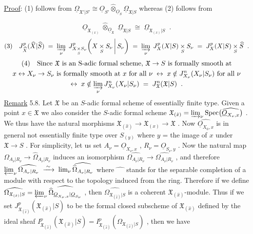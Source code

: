 \underline{Proof}: (1) follows from $\underline{\Omega}_{\mathfrak{X}'|S'} \cong \underline{O}_{S'} \widehat{\otimes}_{\underline{O}_S} \underline{\Omega}_{\mathfrak{X}|S}$ whereas (2) follows from

\begin{equation*}
\underline{O}_{\mathfrak{X}_{(x)}} \;\widehat{\otimes}_{\underline{O}_{\mathfrak{X}}}\; \underline{\Omega}_{\mathfrak{X}|S} \;\cong\; \underline{\Omega}_{\mathfrak{X}_{(x)}|S} \;\;.
\end{equation*}
\begin{equation*}
(3)\quad J^{p}_{\widehat{X}}(\widehat{X}|\widehat{S}) \;=\; \varinjlim_{\nu} \; J^{p}_{X \underset{S}{\times} S_\nu}\!\left(X \underset{S}{\times} S_\nu \,\middle|\, S_\nu\right) \;=\; \varinjlim_{\nu} \; J^{p}_{X}(X|S) \underset{S}{\times} S_\nu \;=\; J^{p}_{X}(X|S) \underset{S}{\times} \widehat{S} \;\;.
\end{equation*}
\begin{multline*}
(4)\quad \text{Since } \mathfrak{X} \text{ is an S-adic formal scheme, } \mathfrak{X} \to S \text{ is formally smooth at}\\ x \leftrightarrow X_\nu \to S_\nu \text{ is formally smooth at } x \text{ for all } \nu \;\leftrightarrow\; x \notin J^{n}_{X_\nu}(X_\nu|S_\nu) \text{ for all } \nu\\ \leftrightarrow\; x \notin \varinjlim_{\nu} J^{n}_{X_\nu}(X_\nu|S_\nu) \;=\; J^{n}_{\mathfrak{X}}(\mathfrak{X}|S) \;\;.
\end{multline*}
\underline{Remark} 5.8. Let $\mathfrak{X}$ be an $S$-adic formal scheme of essentially finite type. Given a point $x \in \mathfrak{X}$ we also consider the $S$-adic formal scheme $\mathfrak{X}_{(\hat{x})} = \varinjlim_{\nu} \mathrm{Spec}\big(\widehat{\underline{O}_{X_\nu,x}}\big)$ . We thus have the natural morphisms $\mathfrak{X}_{(\hat{x})} \to \mathfrak{X}_{(x)} \to \mathfrak{X}$ . Now $\widehat{\underline{O}_{X_0,x}}$ is in general not essentially finite type over $S_{(y)}$ where $y$ = the image of $x$ under $\mathfrak{X} \to S$ . For simplicity, let us set $A_\nu = \underline{O}_{X_\nu,x}$ , $R_\nu = \underline{O}_{S_\nu,y}$ . Now the natural map $\Omega_{A_\nu|R_\nu} \to \widehat{\Omega}_{A_\nu|R_\nu}$ induces an isomorphism $\widehat{\Omega_{A_\nu|R_\nu}} \to \widehat{\Omega_{A_\nu|R_\nu}}$ , and therefore $\varprojlim_{\nu} \widehat{\Omega_{A_\nu|R_\nu}} \;\xrightarrow{\;\sim\;}\; \lim_{\nu} \widehat{\widehat{\Omega}_{A_\nu|R_\nu}}$ where $\widehat{\phantom{xx}}$ stands for the separable completion of a module with respect to the topology induced from the ring. Therefore if we define $\widehat{\Omega_{\mathfrak{X}_{(\hat{x})}|S}} = \varprojlim_{\nu} \widehat{\widehat{\Omega}_{\underline{O}_{X_\nu,x}|\underline{O}_{S_\nu}}}$ , then $\widehat{\Omega_{\mathfrak{X}_{(\hat{x})}|S}}$ is a coherent $\mathfrak{X}_{(\hat{x})}$-module. Thus if
we set $J^{p}_{\mathfrak{X}_{(\hat{x})}}(\mathfrak{X}_{(\hat{x})}|S)$ to be the formal closed subscheme of $\mathfrak{X}_{(\hat{x})}$ defined by the ideal sheaf $I^{p}_{\mathfrak{X}_{(\hat{x})}}(\mathfrak{X}_{(\hat{x})}|S) = I^{p}_{\mathfrak{X}_{(\hat{x})}}(\Omega_{\mathfrak{X}_{(\hat{x})}|S})$ , then we have

